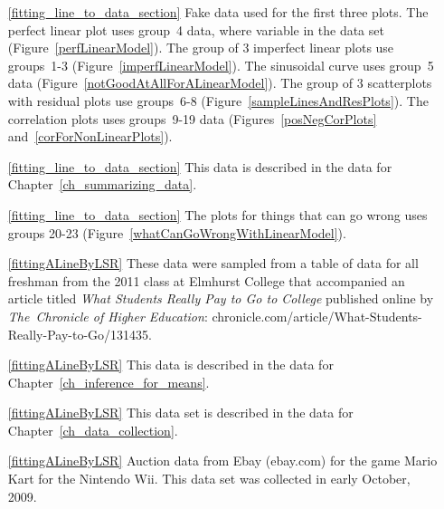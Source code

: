 \begin{itemize}
\item[\ref{fitting_line_to_data_section}]
    Fake data used for the first three plots.
    The perfect linear plot uses group~4 data,
    where  variable in the data set
    (Figure~\ref{perfLinearModel}).
    The group of 3 imperfect linear plots use groups~1-3
    (Figure~\ref{imperfLinearModel}).
    The sinusoidal curve uses group~5 data
    (Figure~\ref{notGoodAtAllForALinearModel}).
        The group of 3 scatterplots with residual plots use groups~6-8
    (Figure~\ref{sampleLinesAndResPlots}).
    The correlation plots uses groups~9-19 data
    (Figures~\ref{posNegCorPlots} and~\ref{corForNonLinearPlots}).

\item[\ref{fitting_line_to_data_section}]
    This data is described in
    the data for Chapter~\ref{ch_summarizing_data}.

\item[\ref{fitting_line_to_data_section}]
    The plots for things that can go wrong uses groups 20-23
    (Figure~\ref{whatCanGoWrongWithLinearModel}).

\item[\ref{fittingALineByLSR}]
    These data were sampled from a table of data for all
    freshman from the 2011 class at Elmhurst College that
    accompanied an article titled
    \emph{What Students Really Pay to Go to College}
    published online by \emph{The~Chronicle of Higher Education}:
        {chronicle.com/article/What-Students-Really-Pay-to-Go/131435}.

\item[\ref{fittingALineByLSR}]
    This data is described in
    the data for Chapter~\ref{ch_inference_for_means}.

\item[\ref{fittingALineByLSR}]
    This data set is described in
    the data for Chapter~\ref{ch_data_collection}.

\item[\ref{fittingALineByLSR}]
    Auction data from Ebay (ebay.com) for the game Mario Kart
    for the Nintendo Wii.
    This data set was collected in early October, 2009.


\end{itemize}
